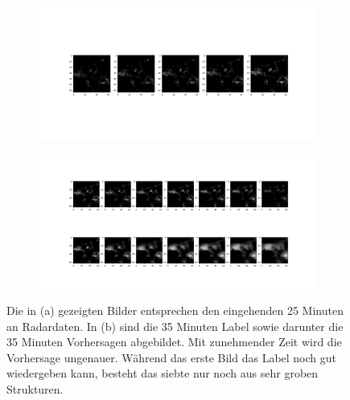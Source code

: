 \begin{figure}[h]
	\centering
	\begin{subfigure}[]{\linewidth} 
		\centering
		\includegraphics[width=\linewidth]{pics/dt2.png}
		\caption[]{}\label{fa}
	\end{subfigure}
	
	\begin{subfigure}[]{\linewidth} 
		\centering
		\includegraphics[width=\linewidth]{pics/t2.png}
		\caption[]{}\label{fb}
	\end{subfigure}
	
	\caption[Validierungsdaten und Label sowie Vorhersage 1]{Die in (a) gezeigten Bilder entsprechen den eingehenden 25 Minuten an Radardaten. In (b) sind die 35 Minuten Label sowie darunter die 35 Minuten Vorhersagen abgebildet. Mit zunehmender Zeit wird die Vorhersage ungenauer. Während das erste Bild das Label noch gut wiedergeben kann, besteht das siebte nur noch aus sehr groben Strukturen.}
	\label{vieleBilder1}
\end{figure}

